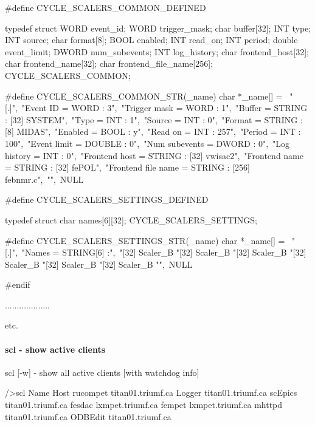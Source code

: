 \begin{DoxyCode}
#define CYCLE_SCALERS_COMMON_DEFINED

typedef struct {
  WORD      event_id;
  WORD      trigger_mask;
  char      buffer[32];
  INT       type;
  INT       source;
  char      format[8];
  BOOL      enabled;
  INT       read_on;
  INT       period;
  double    event_limit;
  DWORD     num_subevents;
  INT       log_history;
  char      frontend_host[32];
  char      frontend_name[32];
  char      frontend_file_name[256];
} CYCLE_SCALERS_COMMON;

#define CYCLE_SCALERS_COMMON_STR(_name) char *_name[] = {\
"[.]",\
"Event ID = WORD : 3",\
"Trigger mask = WORD : 1",\
"Buffer = STRING : [32] SYSTEM",\
"Type = INT : 1",\
"Source = INT : 0",\
"Format = STRING : [8] MIDAS",\
"Enabled = BOOL : y",\
"Read on = INT : 257",\
"Period = INT : 100",\
"Event limit = DOUBLE : 0",\
"Num subevents = DWORD : 0",\
"Log history = INT : 0",\
"Frontend host = STRING : [32] vwisac2",\
"Frontend name = STRING : [32] fePOL",\
"Frontend file name = STRING : [256] febnmr.c",\
"",\
NULL }

#define CYCLE_SCALERS_SETTINGS_DEFINED

typedef struct {
  char      names[6][32];
} CYCLE_SCALERS_SETTINGS;

#define CYCLE_SCALERS_SETTINGS_STR(_name) char *_name[] = {\
"[.]",\
"Names = STRING[6] :",\
"[32] Scaler_B%
"[32] Scaler_B%
"[32] Scaler_B%
"[32] Scaler_B%
"[32] Scaler_B%
"[32] Scaler_B%
"",\
NULL }

#endif

...................

etc.
\end{DoxyCode}


\label{RC_odbedit_examples_idx_clients_active_odbedit}
\hypertarget{RC_odbedit_examples_idx_clients_active_odbedit}{}
 

\hypertarget{RC_odbedit_examples_RC_odbedit_scl}{}\paragraph{scl -\/ show active clients}\label{RC_odbedit_examples_RC_odbedit_scl}

\begin{DoxyCode}
scl [-w]                - show all active clients [with watchdog info]
\end{DoxyCode}
 \par
 
\begin{DoxyCode}
/>scl
Name                Host
rucompet            titan01.triumf.ca
Logger              titan01.triumf.ca
scEpics             titan01.triumf.ca
fesdac              lxmpet.triumf.ca
fempet              lxmpet.triumf.ca
mhttpd              titan01.triumf.ca
ODBEdit             titan01.triumf.ca
\end{DoxyCode}




